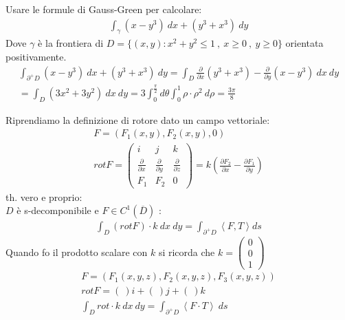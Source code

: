 \documentclass[a4paper, oneside]{article}
\begin{document}
\begin{example}
  Usare le formule di Gauss-Green per calcolare:
  \begin{gather*}
    \int_\gamma (x-y^3) \ dx + (y^3 + x^3) \ dy
  \end{gather*}
  Dove $\gamma$ è la frontiera di $D = \{ (x,y): x^2+y^2 \leq 1 \ , \ x \geq 0 \ , \ y \geq 0 \}$ orientata positivamente.\\
  \begin{gather*}
    \int_{\partial^+ D} (x-y^3) \ dx + (y^3 + x^3) \ dy = \int_D \frac{\partial}{\partial x} (y^3 + x^3) - \frac{\partial}{\partial y} (x - y^3) \ dx \ dy\\
    = \int_D (3x^2 + 3y^2) \ dx \ dy = 3 \int_0^\frac{\pi}{2} d\theta \int_0^1 \rho \cdot \rho^2 \ d\rho = \frac{3\pi}{8}
  \end{gather*}
\end{example}

\begin{theorem}
  Riprendiamo la definizione di rotore dato un campo vettoriale:
  \begin{gather*}
    F = (F_1(x,y), F_2(x,y), 0)\\
    rot F = \begin{pmatrix}
      i & j & k\\
      \frac{\partial}{\partial x} & \frac{\partial}{\partial y} & \frac{\partial}{\partial z}\\
      F_1 & F_2 & 0
    \end{pmatrix} = k \left( \frac{\partial F_2}{\partial x} - \frac{\partial F_1}{\partial y} \right) 
  \end{gather*}
  th. vero e proprio:\\
   $D$ è s-decomponibile e $F \in C^1(\overline{D})$ :
  \begin{gather*}
    \int_D (rotF) \cdot k \ dx \ dy = \int_{\partial^+ D} \left\langle F,T \right\rangle ds 
  \end{gather*}
  Quando fo il prodotto scalare con $k$ si ricorda che $k = \begin{pmatrix}0\\ 0 \\ 1\end{pmatrix}$
  \begin{gather*}
    F = (F_1(x,y,z), F_2(x,y,z), F_3(x,y,z))\\
    rot F = ( \ )i + ( \ )j + ( \ )k\\
    \int_D rot \cdot k \ dx \ dy = \int_{\partial^+ D} \left\langle F \cdot T \right\rangle \ ds 
  \end{gather*}
\end{theorem}
\end{document}
